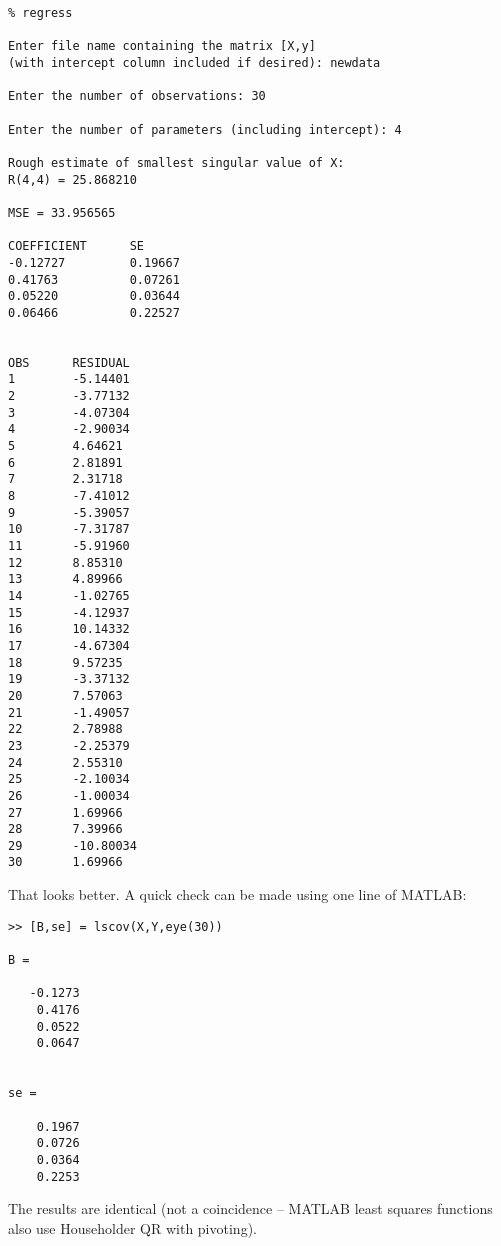 \documentclass{article}
\begin{document}
\begin{verbatim}
% regress
 
Enter file name containing the matrix [X,y] 
(with intercept column included if desired): newdata
 
Enter the number of observations: 30
 
Enter the number of parameters (including intercept): 4
 
Rough estimate of smallest singular value of X:
R(4,4) = 25.868210
 
MSE = 33.956565
 
COEFFICIENT      SE 
-0.12727         0.19667
0.41763          0.07261
0.05220          0.03644
0.06466          0.22527
 
 
OBS      RESIDUAL
1        -5.14401
2        -3.77132
3        -4.07304
4        -2.90034
5        4.64621
6        2.81891
7        2.31718
8        -7.41012
9        -5.39057
10       -7.31787
11       -5.91960
12       8.85310
13       4.89966
14       -1.02765
15       -4.12937
16       10.14332
17       -4.67304
18       9.57235
19       -3.37132
20       7.57063
21       -1.49057
22       2.78988
23       -2.25379
24       2.55310
25       -2.10034
26       -1.00034
27       1.69966
28       7.39966
29       -10.80034
30       1.69966
\end{verbatim}
That looks better.  A quick check can be made using one line of
MATLAB:
\begin{verbatim}
>> [B,se] = lscov(X,Y,eye(30))
 
B =
 
   -0.1273
    0.4176
    0.0522
    0.0647
 
 
se =
 
    0.1967
    0.0726
    0.0364
    0.2253
\end{verbatim}
The results are identical (not a coincidence -- MATLAB 
least squares functions also use Householder QR with pivoting).
\end{document}
